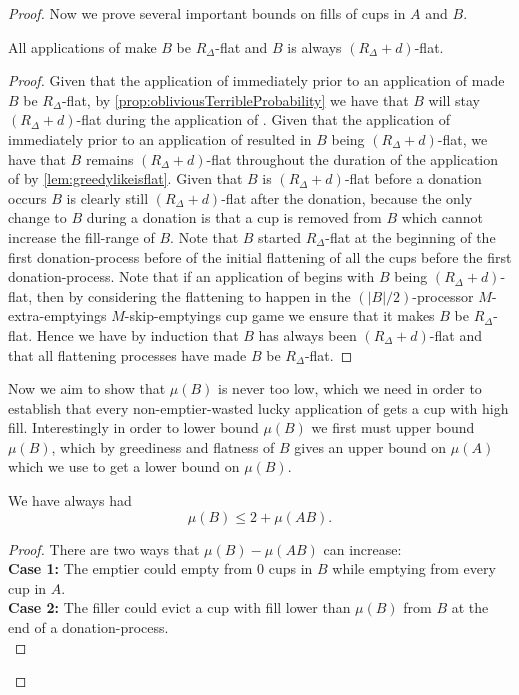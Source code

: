 \begin{proof}
Now we prove several important bounds on fills of cups in $A$ and $B$.
\begin{clm}
  \label{clm:allflatteningsworkbyM}
  All applications of \flatalg make $B$ be $R_\Delta$-flat and
  $B$ is always $(R_\Delta + d)$-flat.
\end{clm}
\begin{proof}
  Given that the application of \flatalg immediately prior to an application
  of \randalg made $B$ be $R_\Delta$-flat, by
  \cref{prop:obliviousTerribleProbability} we have that $B$ will
  stay $(R_\Delta + d)$-flat during the application of \randalg. 
  Given that the application of \randalg immediately prior to an
  application of \flatalg resulted in $B$ being $(R_\Delta
  + d)$-flat, we have that $B$ remains $(R_\Delta + d)$-flat
  throughout the duration of the application of \flatalg by
  \cref{lem:greedylikeisflat}. Given that $B$ is $(R_\Delta +
  d)$-flat before a donation occurs $B$ is clearly still $(R_\Delta +
  d)$-flat after the donation, because the only change to $B$ during
  a donation is that a cup is removed from $B$ which cannot increase
  the fill-range of $B$.
  Note that $B$ started $R_\Delta$-flat at the beginning of the
  first donation-process before of the initial flattening of all
  the cups before the first donation-process.
  Note that if an application of \flatalg begins with $B$ being
  $(R_\Delta + d)$-flat, then by considering the flattening to
  happen in the $(|B|/2)$-processor $M$-extra-emptyings
  $M$-skip-emptyings cup game we ensure that it makes $B$ be
  $R_\Delta$-flat.
  Hence we have by induction that $B$ has always been $(R_\Delta
  + d)$-flat and that all flattening processes have made $B$ be
  $R_\Delta$-flat. 
\end{proof}

Now we aim to show that $\mu(B)$ is never too low, which we need
in order to establish that every non-emptier-wasted lucky
application of \randalg gets a cup with high fill. Interestingly
in order to lower bound $\mu(B)$ we first must upper bound
$\mu(B)$, which by greediness and flatness of $B$ gives an upper
bound on $\mu(A)$ which we use to get a lower bound on $\mu(B)$.

\begin{clm}
  \label{clm:muBdoesntgettoobig}
  We have always had
  $$\mu(B) \le 2 + \mu(A B).$$
\end{clm}
\begin{proof}
  There are two ways that $\mu(B)-\mu(A B)$ can increase: \\
  \textbf{Case 1:}
  The emptier could empty from $0$ cups in $B$ while emptying
  from every cup in $A$. \\
  \textbf{Case 2:}
  The filler could evict a cup with fill lower than $\mu(B)$ from
  $B$ at the end of a donation-process. \\


\end{proof}
\end{proof}
